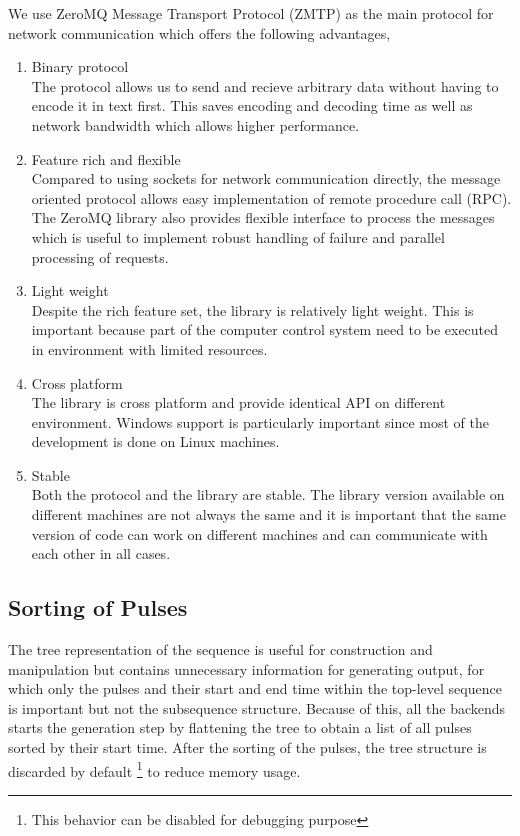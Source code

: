 We use ZeroMQ Message Transport Protocol (ZMTP) as the main protocol for network communication
which offers the following advantages,
\begin{enumerate}
\item Binary protocol\\
  The protocol allows us to send and recieve arbitrary data without having to encode it
  in text first. This saves encoding and decoding time as well as network bandwidth
  which allows higher performance.
\item Feature rich and flexible\\
  Compared to using sockets for network communication directly,
  the message oriented protocol allows easy implementation of remote procedure call (RPC).
  The ZeroMQ library also provides flexible interface to process the messages
  which is useful to implement robust handling of failure
  and parallel processing of requests.
\item Light weight\\
  Despite the rich feature set, the library is relatively light weight.
  This is important because part of the computer control system
  need to be executed in environment with limited resources.
\item Cross platform\\
  The library is cross platform and provide identical API on different environment.
  Windows support is particularly important since most of the development is done
  on Linux machines.
\item Stable\\
  Both the protocol and the library are stable.
  The library version available on different machines are not always the same
  and it is important that the same version of code can work on different machines
  and can communicate with each other in all cases.
\end{enumerate}

\subsection{Sorting of Pulses}
The tree representation of the sequence is useful for construction and manipulation
but contains unnecessary information for generating output,
for which only the pulses and their start and end time
within the top-level sequence is important but not the subsequence structure.
Because of this, all the backends starts the generation step by
flattening the tree to obtain a list of all pulses sorted by their start time.
After the sorting of the pulses, the tree structure is discarded by default
\footnote{This behavior can be disabled for debugging purpose} to reduce memory usage.

